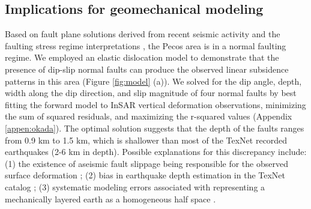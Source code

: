 \subsection{Implications for geomechanical modeling}
Based on fault plane solutions derived from recent seismic activity and the faulting stress regime interpretations \citep{LundSnee2018StateStressPermian}, the Pecos area is in a normal faulting regime. We employed an elastic dislocation model \citep{Okada1992InternalDeformationDue} to demonstrate that the presence of dip-slip normal faults can produce the observed linear subsidence patterns in this area (Figure \ref{fig:model} (a)). We solved for the dip angle, depth, width along the dip direction, and slip magnitude of four normal faults by best fitting the forward model to InSAR vertical deformation observations, minimizing the sum of squared residuals, and maximizing the r-squared values \citep{Du1992ComparisonVariousInversion} (Appendix \ref{appen:okada}). The optimal solution suggests that the depth of the faults ranges from 0.9 km to 1.5 km, which is shallower than most of the TexNet recorded earthquakes (2-6 km in depth). Possible explanations for this discrepancy include: (1) the existence of aseismic fault slippage being responsible for the observed surface deformation \citep{McGarr2017WastewaterDisposalEarthquake}; (2) bias in earthquake depth estimation in the TexNet catalog \citep{Lomax2019ImprovingAbsoluteEarthquake}; (3) systematic modeling errors associated with representing a mechanically layered earth as a homogeneous half space \citep{Du1992ComparisonVariousInversion}. 



